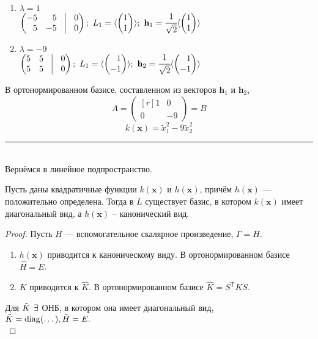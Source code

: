 	\begin{enumerate}
		\item $\lambda =1$ \\
		$\begin{pmatrix*}[r]
			-5 & 5 & \vrule &0 \\
			5 & -5 & \vrule &0
		\end{pmatrix*};~L_1 = 
		\langle \begin{pmatrix*}[r]
		1\\ 
		1
		\end{pmatrix*}
		\rangle
		;~ \textbf{h}_1 = \cfrac{1}{\sqrt{2}}\langle \begin{pmatrix*}[r]
		1\\ 
		1
		\end{pmatrix*}
		\rangle$ 
		\item $\lambda =-9$ \\
		$\begin{pmatrix*}[r]
		5 & 5 & \vrule &0 \\
		5 & 5 & \vrule &0
		\end{pmatrix*};~L_1 = 
		\langle \begin{pmatrix*}[r]
		1\\ 
		-1
		\end{pmatrix*}
		\rangle
		;~ \textbf{h}_2 = \cfrac{1}{\sqrt{2}}\langle \begin{pmatrix*}[r]
		1\\ 
		-1
		\end{pmatrix*}
		\rangle$ 
	\end{enumerate}
В ортонормированном базисе, составленном из векторов $\textbf{h}_1$ и $\textbf{h}_2$, \\
$$A = \begin{pmatrix*}[r]
1 & 0 \\0 & -9
\end{pmatrix*} = B$$
$$k(\textbf{x}) = \tilde{x}^2_1 - 9\tilde{x}^2_2$$
\hrule
~\
\\
Вернёмся в линейное подпространство. 
\begin{theorem}Пусть даны квадратичные функции $k(\textbf{x})$ и $h(\textbf{x})$, причём $h(\textbf{x})$ --- положительно определена. Тогда в $L$ существует базис, в котором $k(\textbf{x})$ имеет диагональный вид, а $h(\textbf{x})$ -- канонический вид.
\end{theorem}
\begin{proof}
Пусть $H$ --- вспомогательное скалярное произведение, $\Gamma = H$.
\begin{enumerate}
	\item $h(\textbf{x})$ приводится к каноническому виду. В ортонормированном базисе $\hat H = E$.
	\item $K$ приводится к $\hat K$. В ортонормированном базисе $\hat K = S^{\text{T}}KS$.
\end{enumerate}
Для $\Tilde K \:\: \exists $ ОНБ, в котором она имеет диагональный вид, \\
$\Tilde K =\operatorname{\mathop{diag}}(\dots), \Tilde H =E.$\\
\end{proof}
